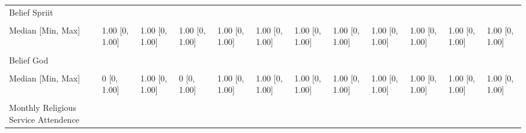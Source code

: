 \documentclass[
  single column]{article}
\begin{document}
\begin{landscape}
\begin{longtable}[t]{llllllllllll}
Belief Spriit &  &  &  &  &  &  &  &  &  &  & \\
\addlinespace
\cellcolor{gray!10}{Mean (SD)} & \cellcolor{gray!10}{0.539 (0.498)} & \cellcolor{gray!10}{0.850 (0.358)} & \cellcolor{gray!10}{0.835 (0.372)} & \cellcolor{gray!10}{0.869 (0.338)} & \cellcolor{gray!10}{0.866 (0.341)} & \cellcolor{gray!10}{0.843 (0.364)} & \cellcolor{gray!10}{0.915 (0.279)} & \cellcolor{gray!10}{0.726 (0.449)} & \cellcolor{gray!10}{0.644 (0.479)} & \cellcolor{gray!10}{0.830 (0.376)} & \cellcolor{gray!10}{0.924 (0.265)}\\
Median [Min, Max] & 1.00 [0, 1.00] & 1.00 [0, 1.00] & 1.00 [0, 1.00] & 1.00 [0, 1.00] & 1.00 [0, 1.00] & 1.00 [0, 1.00] & 1.00 [0, 1.00] & 1.00 [0, 1.00] & 1.00 [0, 1.00] & 1.00 [0, 1.00] & 1.00 [0, 1.00]\\
\cellcolor{gray!10}{Missing} & \cellcolor{gray!10}{7 (0.0\%)} & \cellcolor{gray!10}{60 (4.4\%)} & \cellcolor{gray!10}{10 (3.7\%)} & \cellcolor{gray!10}{77 (3.8\%)} & \cellcolor{gray!10}{121 (3.3\%)} & \cellcolor{gray!10}{38 (3.5\%)} & \cellcolor{gray!10}{6 (4.4\%)} & \cellcolor{gray!10}{3 (3.4\%)} & \cellcolor{gray!10}{4 (0.6\%)} & \cellcolor{gray!10}{35 (6.1\%)} & \cellcolor{gray!10}{35 \vphantom{1} (4.7\%)}\\
Belief God &  &  &  &  &  &  &  &  &  &  & \\
\cellcolor{gray!10}{Mean (SD)} & \cellcolor{gray!10}{0.165 (0.371)} & \cellcolor{gray!10}{0.798 (0.402)} & \cellcolor{gray!10}{0.281 (0.450)} & \cellcolor{gray!10}{0.885 (0.319)} & \cellcolor{gray!10}{0.951 (0.216)} & \cellcolor{gray!10}{0.893 (0.309)} & \cellcolor{gray!10}{0.738 (0.441)} & \cellcolor{gray!10}{0.548 (0.501)} & \cellcolor{gray!10}{0.954 (0.209)} & \cellcolor{gray!10}{0.828 (0.378)} & \cellcolor{gray!10}{0.573 (0.495)}\\
\addlinespace
Median [Min, Max] & 0 [0, 1.00] & 1.00 [0, 1.00] & 0 [0, 1.00] & 1.00 [0, 1.00] & 1.00 [0, 1.00] & 1.00 [0, 1.00] & 1.00 [0, 1.00] & 1.00 [0, 1.00] & 1.00 [0, 1.00] & 1.00 [0, 1.00] & 1.00 [0, 1.00]\\
\cellcolor{gray!10}{Missing} & \cellcolor{gray!10}{7 (0.0\%)} & \cellcolor{gray!10}{60 (4.4\%)} & \cellcolor{gray!10}{10 (3.7\%)} & \cellcolor{gray!10}{77 (3.8\%)} & \cellcolor{gray!10}{121 (3.3\%)} & \cellcolor{gray!10}{38 (3.5\%)} & \cellcolor{gray!10}{6 (4.4\%)} & \cellcolor{gray!10}{3 (3.4\%)} & \cellcolor{gray!10}{4 (0.6\%)} & \cellcolor{gray!10}{35 (6.1\%)} & \cellcolor{gray!10}{35 (4.7\%)}\\
Monthly Religious Service Attendence &  &  &  &  &  &  &  &  &  &  & \\

\end{longtable}
\end{landscape}
\end{document}
